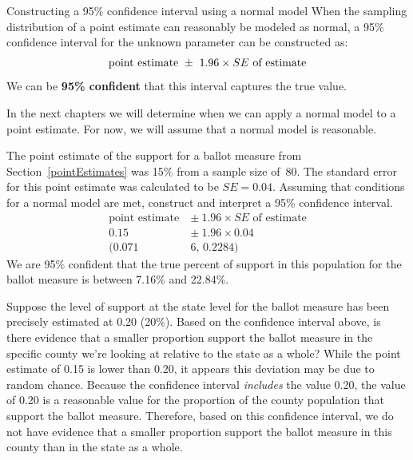 \begin{onebox}{Constructing a 95\% confidence interval using a normal model}
When the sampling distribution of a point estimate can reasonably be modeled as normal, a 95\% confidence interval for the unknown parameter can be constructed as: \vspace{-2mm}
\begin{align}
\text{point estimate}\ \pm\ 1.96 \times SE\text{ of estimate}\vspace{-2mm}
\end{align}
We can be \textbf{95\% confident} that this interval captures the true value.\end{onebox}
\label{95PercentConfidenceIntervalFormula}


In the next chapters we will determine when we can apply a normal model to a point estimate. For now, we will assume that a normal model is reasonable. 

\begin{examplewrap}
\begin{nexample}{The point estimate of the support for a ballot measure
    from Section~\ref{pointEstimates} was 15\% from a sample size of~80.
    The standard error for this point estimate was calculated to be $SE = 0.04$.
    Assuming that conditions for a normal model are met,
    construct and interpret a 95\% confidence interval.  }
\begin{align*}
\text{point estimate}\ &\pm \ 1.96\times SE \text{ of estimate} \\
0.15\  &\pm \ 1.96\times 0.04\\
(0.071&6\text{, } 0.2284)
\end{align*}
We are 95\% confident that the true percent of support in this population
for the ballot measure is between 7.16\% and 22.84\%.
\end{nexample}
\end{examplewrap}

\begin{examplewrap}
\begin{nexample}{Suppose the level of support at the state level for the
    ballot measure has been precisely estimated at 0.20 (20\%).
    Based on the confidence interval above,
    is there evidence that a smaller proportion support the ballot measure
    in the specific county we're looking at relative to the state as a whole?}
While the point estimate of 0.15 is lower than 0.20, it appears this deviation
may be due to random chance.
Because the confidence interval \emph{includes} the value 0.20,
the value of 0.20 is a reasonable value for the proportion of the county
population that support the ballot measure.
Therefore, based on this confidence interval, we do not have evidence that
a smaller proportion support the ballot measure in this county than in the
state as a whole.
\end{nexample}
\end{examplewrap}

